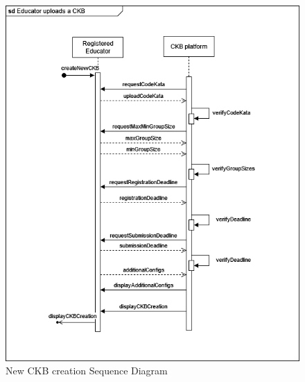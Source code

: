 \begin{center}
    \begin{figure} [H]
        \begin{center}
            \includegraphics[width=0.9\linewidth]{Images/SequenceDiagrams/SD_12.png}
            \caption{New CKB creation Sequence Diagram}
            \label{fig: new_CKB_seq_diag}
        \end{center}
    \end{figure}
\end{center}



